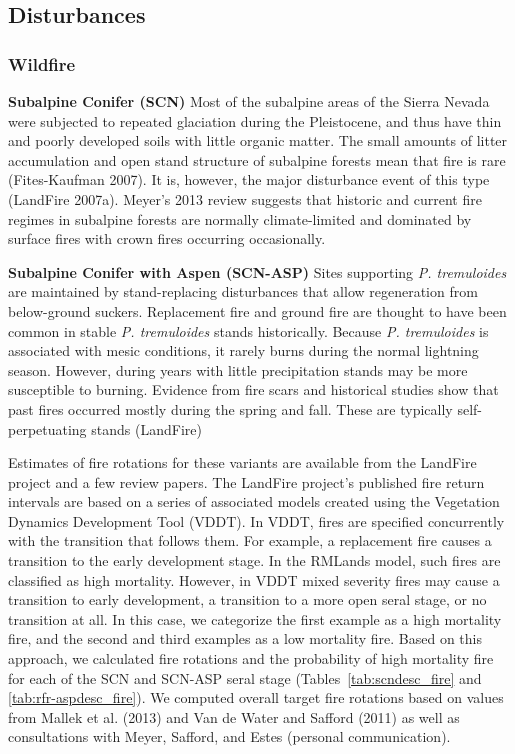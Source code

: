 \subsection*{Disturbances}

\subsubsection{Wildfire}
\textbf{Subalpine Conifer (SCN)} Most of the subalpine areas of the Sierra Nevada were subjected to repeated glaciation during the Pleistocene, and thus have thin and poorly developed soils with little organic matter. The small amounts of litter accumulation and open stand structure of subalpine forests mean that fire is rare (Fites-Kaufman 2007). It is, however, the major disturbance event of this type (LandFire 2007a). Meyer’s 2013 review suggests that historic and current fire regimes in subalpine forests are normally climate-limited and dominated by surface fires with crown fires occurring occasionally.  

\textbf{Subalpine Conifer with Aspen (SCN-ASP)} Sites supporting \emph{P. tremuloides} are maintained by stand-replacing disturbances that allow regeneration from below-ground suckers. Replacement fire and ground fire are thought to have been common in stable \emph{P. tremuloides} stands historically. Because \emph{P. tremuloides} is associated with mesic conditions, it rarely burns during the normal lightning season. However, during years with little precipitation stands may be more susceptible to burning. Evidence from fire scars and historical studies show that past fires occurred mostly during the spring and fall. These are typically self-perpetuating stands (LandFire)

Estimates of fire rotations for these variants are available from the LandFire project and a few review papers. The LandFire project’s published fire return intervals are based on a series of associated models created using the Vegetation Dynamics Development Tool (VDDT). In VDDT, fires are specified concurrently with the transition that follows them. For example, a replacement fire causes a transition to the early development stage. In the RMLands model, such fires are classified as high mortality. However, in VDDT mixed severity fires may cause a transition to early development, a transition to a more open seral stage, or no transition at all. In this case, we categorize the first example as a high mortality fire, and the second and third examples as a low mortality fire. Based on this approach, we calculated fire rotations and the probability of high mortality fire for each of the SCN and SCN-ASP seral stage (Tables~\ref{tab:scndesc_fire} and \ref{tab:rfr-aspdesc_fire}). We computed overall target fire rotations based on values from Mallek et al. (2013) and Van de Water and Safford (2011) as well as consultations with Meyer, Safford, and Estes (personal communication). 





